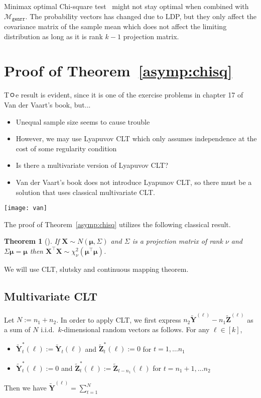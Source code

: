 \documentclass[11pt]{article} %
\newcommand{\vecBold}[1]{\boldsymbol{#1}} %
\newcommand{\alphabetSize}{k}
\newcommand{\genrr}{\mathcal{M}_{\texttt{genrr}}}
\newcommand{\rvY}{Y}
\newcommand{\rVecY}{\vecBold{\rvY}}
\newcommand{\rvZ}{Z}
\newcommand{\rVecZ}{\vecBold{\rvZ}}
\newtheorem{theorem}{Theorem}[section]
\begin{document}
Minimax optimal Chi-square test~\citet{Arias-Castro2018RememberDimension} might not stay optimal when combined with $\genrr$.
The probability vectors has changed due to LDP, but they only affect the covariance matrix of the sample mean which does not affect the limiting distribution as long as it is rank $\alphabetSize-1$ projection matrix.

\section{Proof of Theorem~\ref{asymp:chisq} }

Tㅇe result is evident, since it is one of the exercise problems in chapter 17 of Van der Vaart's book, but...
\begin{itemize}
	\item Unequal sample size seems to cause trouble
	\item However, we may use Lyapuvov CLT which only assumes independence at the cost of some regularity condition
	\item Is there a multivariate version of Lyapuvov CLT?
	\item Van der Vaart's book does not introduce Lyapunov CLT, so there must be a solution that uses classical multivariate CLT. 
\end{itemize}
\begin{figure*}
	\texttt{[image: van]}
\end{figure*}
The proof of Theorem~\ref{asymp:chisq}  utilizes the following classical result.
\begin{theorem}[\citet{ferguson1996course}]
	If $\boldsymbol{X} \sim N(\boldsymbol{\mu}, \Sigma)$
	and
	$\Sigma$ is a projection matrix of rank $\nu$ and $\Sigma \boldsymbol{\mu} = \boldsymbol{\mu}$ then 
	$\boldsymbol{X}^\top \boldsymbol{X}  \sim \chi^2_\nu (\boldsymbol{\mu}^\top \boldsymbol{\mu})$.
\end{theorem}
We will use CLT, slutsky and continuous mapping theorem.
\subsection{Multivariate CLT}
Let $N:=n_1 + n_2$.
In order to apply CLT, 
we first express $n_2 \tilde{\rVecY}^{(\ell)} - n_1 \tilde{\rVecZ}^{(\ell)}$ as a sum of $N$ i.i.d.~$\alphabetSize$-dimensional random vectors as follows. For any $\ell \in [\alphabetSize]$,
\begin{itemize}
	\item $\tilde{\rVecY}_t^\ast(\ell) := \tilde{\rVecY}_t(\ell)$ and $\tilde{\rVecZ}_t^\ast(\ell) := 0$ for  $t=1,\ldots n_1$
	\item $\tilde{\rVecY}_t^\ast(\ell) := 0$ and $\tilde{\rVecZ}_t^\ast(\ell) := \tilde{\rVecZ}_{t-n_1}(\ell)$ for  $t=n_1+1,\ldots n_2$
\end{itemize}
Then we have $\tilde{\rVecY}^{(\ell)} = \sum_{t=1}^N$
		
\end{document}
